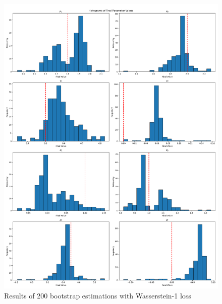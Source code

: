 \begin{figure}
    \includegraphics[width=\textwidth]{./Images/main_case_histograms.png}
    \caption{Results of 200 bootstrap estimations with Wasserstein-1 loss}
    \label{fig:main_case_histrograms}
\end{figure}

